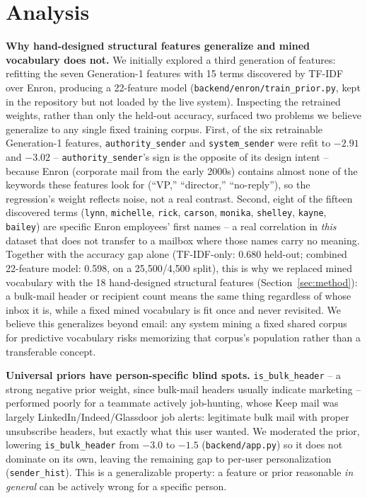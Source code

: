 \documentclass[twoside,twocolumn,10pt]{article}
\begin{document}
\section{Analysis}
\label{sec:analysis}

\textbf{Why hand-designed structural features generalize and mined vocabulary does not.} We initially explored a third generation of features: refitting the seven Generation-1 features with 15 terms discovered by TF-IDF over Enron, producing a 22-feature model (\texttt{backend/enron/train\_prior.py}, kept in the repository but not loaded by the live system). Inspecting the retrained weights, rather than only the held-out accuracy, surfaced two problems we believe generalize to any single fixed training corpus. First, of the six retrainable Generation-1 features, \texttt{authority\_sender} and \texttt{system\_sender} were refit to $-2.91$ and $-3.02$ -- \texttt{authority\_sender}'s sign is the opposite of its design intent -- because Enron (corporate mail from the early 2000s) contains almost none of the keywords these features look for (``VP,'' ``director,'' ``no-reply''), so the regression's weight reflects noise, not a real contrast. Second, eight of the fifteen discovered terms (\texttt{lynn}, \texttt{michelle}, \texttt{rick}, \texttt{carson}, \texttt{monika}, \texttt{shelley}, \texttt{kayne}, \texttt{bailey}) are specific Enron employees' first names -- a real correlation in \emph{this} dataset that does not transfer to a mailbox where those names carry no meaning. Together with the accuracy gap alone (TF-IDF-only: 0.680 held-out; combined 22-feature model: 0.598, on a 25{,}500/4{,}500 split), this is why we replaced mined vocabulary with the 18 hand-designed structural features (Section~\ref{sec:method}): a bulk-mail header or recipient count means the same thing regardless of whose inbox it is, while a fixed mined vocabulary is fit once and never revisited. We believe this generalizes beyond email: any system mining a fixed shared corpus for predictive vocabulary risks memorizing that corpus's population rather than a transferable concept.

\textbf{Universal priors have person-specific blind spots.} \texttt{is\_bulk\_header} -- a strong negative prior weight, since bulk-mail headers usually indicate marketing -- performed poorly for a teammate actively job-hunting, whose Keep mail was largely LinkedIn/Indeed/Glassdoor job alerts: legitimate bulk mail with proper unsubscribe headers, but exactly what this user wanted. We moderated the prior, lowering \texttt{is\_bulk\_header} from $-3.0$ to $-1.5$ (\texttt{backend/app.py}) so it does not dominate on its own, leaving the remaining gap to per-user personalization (\texttt{sender\_hist}). This is a generalizable property: a feature or prior reasonable \emph{in general} can be actively wrong for a specific person.
\end{document}
